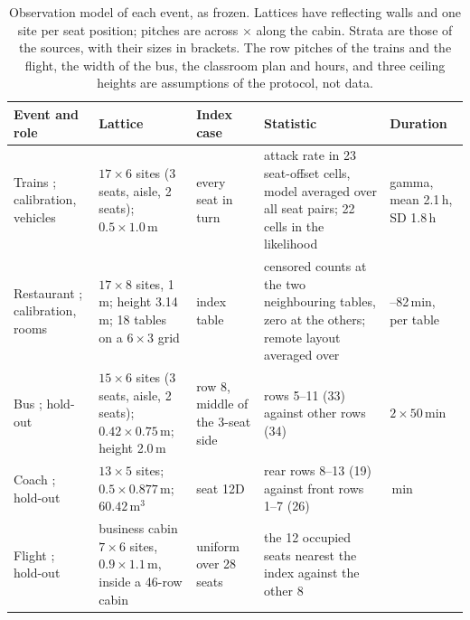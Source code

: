 \begin{table}[tbp]
  \centering\footnotesize
  \caption{Observation model of each event, as frozen. Lattices have reflecting walls and one site per seat
  position; pitches are across $\times$ along the cabin. Strata are those of the sources, with their sizes in
  brackets. The row pitches of the trains and the flight, the width of the bus, the classroom plan and hours,
  and three ceiling heights are assumptions of the protocol, not data.}
  \label{appC_protocol:tab:obs}
  \begin{tabular}{@{}>{\raggedright\arraybackslash}p{}>{\raggedright\arraybackslash}p{}>{\raggedright\arraybackslash}p{}>{\raggedright\arraybackslash}p{}>{\raggedright\arraybackslash}p{}@{}}
    \toprule
    Event and role & Lattice & Index case & Statistic & Duration \\
    \midrule
    Trains \citep{hu2021}; calibration, vehicles &
      $17\times6$ sites (3 seats, aisle, 2 seats); $0.5\times1.0$\,m &
      every seat in turn &
      attack rate in 23 seat-offset cells, model averaged over all seat pairs; 22 cells in the likelihood &
      gamma, mean 2.1\,h, SD 1.8\,h \\
    Restaurant \citep{lu2020,li2021}; calibration, rooms &
      $17\times8$ sites, 1\,m; height 3.14\,m; 18 tables on a $6\times3$ grid &
      index table &
      censored counts at the two neighbouring tables, zero at the others; remote layout averaged over &
      23--82\,min, per table \\
    \addlinespace
    Bus \citep{shen2020}; hold-out &
      $15\times6$ sites (3 seats, aisle, 2 seats); $0.42\times0.75$\,m; height 2.0\,m &
      row 8, middle of the 3-seat side &
      rows 5--11 (33) against other rows (34) &
      $2\times50$\,min \\
    Coach \citep{ou2022}; hold-out &
      $13\times5$ sites; $0.5\times0.877$\,m; $60.42\,\mathrm{m^3}$ &
      seat 12D &
      rear rows 8--13 (19) against front rows 1--7 (26) &
      200\,min \\
    Flight \citep{khanh2020}; hold-out &
      business cabin $7\times6$ sites, $0.9\times1.1$\,m, inside a 46-row cabin &
      uniform over 28 seats &
      the 12 occupied seats nearest the index against the other 8 &

\end{tabular}
\end{table}
